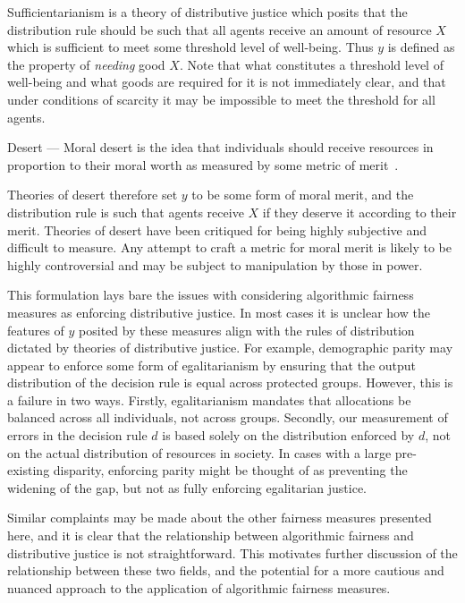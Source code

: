 Sufficientarianism is a theory of distributive justice which posits that the
distribution rule should be such that all agents receive an amount of resource
$X$ which is sufficient to meet some threshold level of well-being. Thus $y$ is
defined as the property of \textit{needing} good $X$. Note that what constitutes
a threshold level of well-being and what goods are required for it is not
immediately clear, and that under conditions of scarcity it may be impossible to
meet the threshold for all agents.

\begin{definition}
    Desert — Moral desert is the idea that individuals should receive resources
    in proportion to their moral worth as measured by some metric of
    merit~\cite{Pojman_1997}.
\end{definition}

Theories of desert therefore set $y$ to be some form of moral merit, and the
distribution rule is such that agents receive $X$ if they deserve it according
to their merit. Theories of desert have been critiqued for being highly
subjective and difficult to measure. Any attempt to craft a metric for moral
merit is likely to be highly controversial and may be subject to manipulation by
those in power. 

This formulation lays bare the issues with considering algorithmic fairness
measures as enforcing distributive justice. In most cases it is unclear how the
features of $y$ posited by these measures align with the rules of distribution
dictated by theories of distributive justice. For example, demographic parity
may appear to enforce some form of egalitarianism by ensuring that the output
distribution of the decision rule is equal across protected groups. However,
this is a failure in two ways. Firstly, egalitarianism mandates that allocations
be balanced across all individuals, not across groups. Secondly, our measurement
of errors in the decision rule $d$ is based solely on the distribution enforced
by $d$, not on the actual distribution of resources in society. In cases with a 
large pre-existing disparity, enforcing parity might be thought of as preventing
the widening of the gap, but not as fully enforcing egalitarian justice.

Similar complaints may be made about the other fairness measures presented here,
and it is clear that the relationship between algorithmic fairness and
distributive justice is not straightforward. This motivates further discussion
of the relationship between these two fields, and the potential for a more
cautious and nuanced approach to the application of algorithmic fairness
measures.
